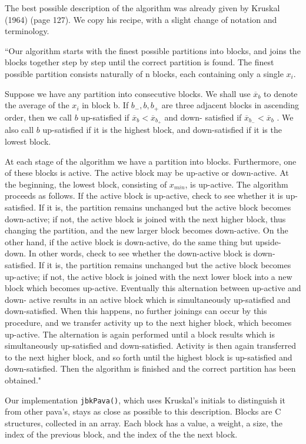 \documentclass[12pt,]{article}
\begin{document}
The best possible description of the algorithm was already given by
Kruskal (1964) (page 127). We copy his recipe, with a slight change of
notation and terminology.

``Our algorithm starts with the finest possible partitions into blocks,
and joins the blocks together step by step until the correct partition
is found. The finest possible partition consists naturally of n blocks,
each containing only a single \(x_i\).

Suppose we have any partition into consecutive blocks. We shall use
\(\overline{x}_b\) to denote the average of the \(x_i\) in block b. If
\(b_- , b, b_+\) are three adjacent blocks in ascending order, then we
call \(b\) up-satisfied if \(\overline{x}_b < \overline{x}_{b_+}\) and
down- satisfied if \(\overline{x}_{b_-} < \overline{x}_b\) . We also
call \(b\) up-satisfied if it is the highest block, and down-satisfied
if it is the lowest block.

At each stage of the algorithm we have a partition into blocks.
Furthermore, one of these blocks is active. The active block may be
up-active or down-active. At the beginning, the lowest block, consisting
of \(x_{min}\), is up-active. The algorithm proceeds as follows. If the
active block is up-active, check to see whether it is up-satisfied. If
it is, the partition remains unchanged but the active block becomes
down-active; if not, the active block is joined with the next higher
block, thus changing the partition, and the new larger block becomes
down-active. On the other hand, if the active block is down-active, do
the same thing but upside-down. In other words, check to see whether the
down-active block is down-satisfied. If it is, the partition remains
unchanged but the active block becomes up-active; if not, the active
block is joined with the next lower block into a new block which becomes
up-active. Eventually this alternation between up-active and down-
active results in an active block which is simultaneously up-satisfied
and down-satisfied. When this happens, no further joinings can occur by
this procedure, and we transfer activity up to the next higher block,
which becomes up-active. The alternation is again performed until a
block results which is simultaneously up-satisfied and down-satisfied.
Activity is then again transferred to the next higher block, and so
forth until the highest block is up-satisfied and down-satisfied. Then
the algorithm is finished and the correct partition has been obtained."

Our implementation \texttt{jbkPava()}, which uses Kruskal's initials to
distinguish it from other pava's, stays as close as possible to this
description. Blocks are C structures, collected in an array. Each block
has a value, a weight, a size, the index of the previous block, and the
index of the the next block.
\end{document}
